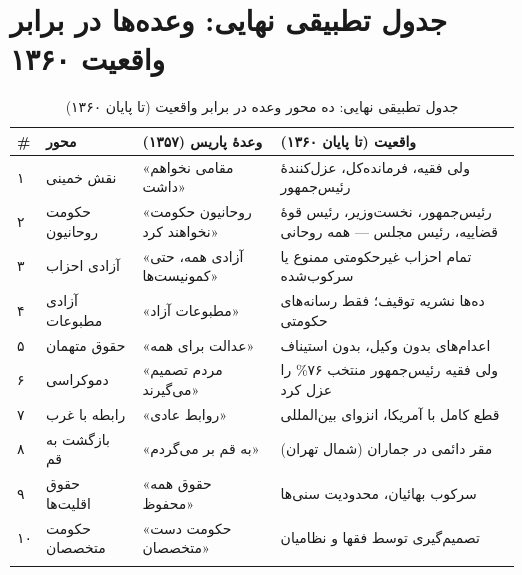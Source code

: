 \documentclass[12pt,a4paper]{book}
\begin{document}
\section{جدول تطبیقی نهایی: وعده‌ها در برابر واقعیت ۱۳۶۰}

\begin{longtable}{%
    >{\centering\arraybackslash}p{}
    >{\raggedleft\arraybackslash}p{}
    >{\raggedleft\arraybackslash}p{}
    >{\raggedleft\arraybackslash}p{}}
\toprule
\rowcolor{cAccent!10}
\textbf{\#} & \textbf{محور} & \textbf{وعدهٔ پاریس (۱۳۵۷)} & \textbf{واقعیت (تا پایان ۱۳۶۰)} \\
\midrule
\endhead

۱ &
نقش خمینی &
«مقامی نخواهم داشت» &
ولی فقیه، فرمانده‌کل، عزل‌کنندهٔ رئیس‌جمهور \\
\midrule

۲ &
حکومت روحانیون &
«روحانیون حکومت نخواهند کرد» &
رئیس‌جمهور، نخست‌وزیر، رئیس قوهٔ قضاییه، رئیس مجلس — همه روحانی \\
\midrule

۳ &
آزادی احزاب &
«آزادی همه، حتی کمونیست‌ها» &
تمام احزاب غیرحکومتی ممنوع یا سرکوب‌شده \\
\midrule

۴ &
آزادی مطبوعات &
«مطبوعات آزاد» &
ده‌ها نشریه توقیف؛ فقط رسانه‌های حکومتی \\
\midrule

۵ &
حقوق متهمان &
«عدالت برای همه» &
اعدام‌های بدون وکیل، بدون استیناف \\
\midrule

۶ &
دموکراسی &
«مردم تصمیم می‌گیرند» &
ولی فقیه رئیس‌جمهور منتخب ۷۶\% را عزل کرد \\
\midrule

۷ &
رابطه با غرب &
«روابط عادی» &
قطع کامل با آمریکا، انزوای بین‌المللی \\
\midrule

۸ &
بازگشت به قم &
«به قم بر می‌گردم» &
مقر دائمی در جماران (شمال تهران) \\
\midrule

۹ &
حقوق اقلیت‌ها &
«حقوق همه محفوظ» &
سرکوب بهائیان، محدودیت سنی‌ها \\
\midrule

۱۰ &
حکومت متخصصان &
«حکومت دست متخصصان» &
تصمیم‌گیری توسط فقها و نظامیان \\

\bottomrule
\caption{جدول تطبیقی نهایی: ده محور وعده در برابر واقعیت (تا پایان ۱۳۶۰)}
\label{tab:final-comparison-1360}
\end{longtable}
\end{document}
